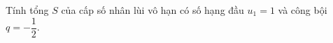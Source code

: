 \begin{ex}
Tính tổng $S$ của cấp số nhân lùi vô hạn có số hạng đầu $u_1=1$ và công bội $q=-\dfrac12$.
\end{ex}
